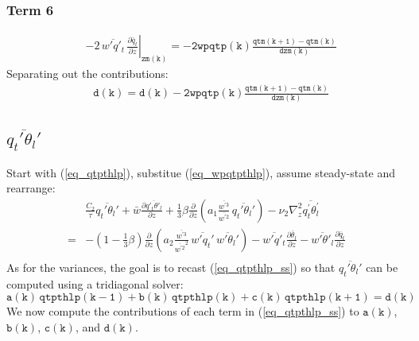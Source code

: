 \documentclass[11pt,fleqn]{article}
\newcommand{\ptlder}[2]{\frac{\partial #1}{\partial #2}}
\begin{document}
\subsubsection{Term 6}

\begin{equation}
\begin{split}
&\left. - 2 \, \overline{w'q'_t} \, \ptlder{\bar{q}_t}{z} \right|_{\mathtt{zm(k)}}
 = \mathtt{ - 2 wpqtp(k) \frac{qtm(k+1)-qtm(k)}{dzm(k)} }
\end{split}
\end{equation}
%
Separating out the contributions:
%
\begin{equation}
\begin{split}
&\mathtt{d(k) = d(k) - 2 wpqtp(k) \frac{qtm(k+1)-qtm(k)}{dzm(k)} }
\end{split}
\end{equation}

\subsection{ $\overline{q_t'\theta_l'}$  }

Start with (\ref{eq_qtpthlp}), substitue (\ref{eq_wpqtpthlp}), assume steady-state 
and rearrange:
%
\begin{equation}
\label{eq_qtpthlp_ss}
\begin{split}
& \frac{C_2}{\tau} \overline{q_t' \theta_l'}
+ \bar{w}\ptlder{\overline{q'_t\theta'_l}}{z}
+ \frac{1}{3} \beta
   \ptlder{}{z}
     \left( 
       a_1
       \frac{\overline{w^{'3}}}{\overline{w^{'2}}} \,
       \overline{q_t'\theta_l'}
     \right)
- \nu_2 \nabla_z^2 \overline{q_t^{'}\theta_l^{'}} \\
=& 
   - \left( 1 - \frac{1}{3}\beta \right)
      \ptlder{}{z}
        \left( 
          a_2
          \frac{\overline{w^{'3}}}{\overline{w^{'2}}^2} \,
          \overline{w'q_t'} \, \overline{w'\theta_l'}
        \right)
   - \overline{w'q'_t}\ptlder{\bar{\theta}_l}{z} 
   - \overline{w'\theta'_l}\ptlder{\bar{q}_t}{z} \\
\end{split}
\end{equation}
%
As for the variances, the goal is to recast (\ref{eq_qtpthlp_ss}) so that 
$\overline{q_t'\theta_l'}$ can be computed using a tridiagonal solver:
%
\begin{equation}
\mathtt{ a(k) \, qtpthlp(k-1) + b(k) \, qtpthlp(k) + c(k) \, qtpthlp(k+1) = d(k) }
\end{equation}
%
We now compute the contributions of each term in (\ref{eq_qtpthlp_ss}) to
$\mathtt{a(k)}$, $\mathtt{b(k)}$, $\mathtt{c(k)}$, and $\mathtt{d(k)}$.
\end{document}
